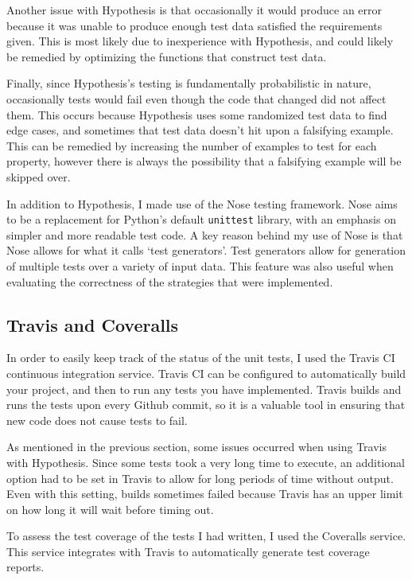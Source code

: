 \documentclass[a4paper,12pt]{article}
\begin{document}
Another issue with Hypothesis is that occasionally it would produce an error because it was unable to produce enough test data satisfied the requirements given.
This is most likely due to inexperience with Hypothesis, and could likely be remedied by optimizing the functions that construct test data.

Finally, since Hypothesis's testing is fundamentally probabilistic in nature, occasionally tests would fail even though the code that changed did not affect them.
This occurs because Hypothesis uses some randomized test data to find edge cases, and sometimes that test data doesn't hit upon a falsifying example.
This can be remedied by increasing the number of examples to test for each property, however there is always the possibility that a falsifying example will be skipped over.

In addition to Hypothesis, I made use of the Nose testing framework.
Nose aims to be a replacement for Python's default \texttt{unittest} library, with an emphasis on simpler and more readable test code.
A key reason behind my use of Nose is that Nose allows for what it calls `test generators'.
Test generators allow for generation of multiple tests over a variety of input data.
This feature was also useful when evaluating the correctness of the strategies that were implemented.

\subsection{Travis and Coveralls}

In order to easily keep track of the status of the unit tests, I used the Travis CI continuous integration service.
Travis CI can be configured to automatically build your project, and then to run any tests you have implemented.
Travis builds and runs the tests upon every Github commit, so it is a valuable tool in ensuring that new code does not cause tests to fail.

As mentioned in the previous section, some issues occurred when using Travis with Hypothesis.
Since some tests took a very long time to execute, an additional option had to be set in Travis to allow for long periods of time without output.
Even with this setting, builds sometimes failed because Travis has an upper limit on how long it will wait before timing out.

To assess the test coverage of the tests I had written, I used the Coveralls service.
This service integrates with Travis to automatically generate test coverage reports.
\end{document}
